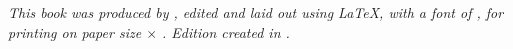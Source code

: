\cleardoublepage %

\begin{slide-frame}
\end{slide-frame}

\newpage
\null
\vfill
\thispagestyle{empty}

{%
\normalsize \itshape This book was produced by \BookAuthor, %
edited and laid out using \LaTeX, %
with a font of \FprShowFont, %
for printing on paper size \BookPaperHeight $\times$ \BookPaperWidth. %
Edition created in \BookEditionYear.%
}

